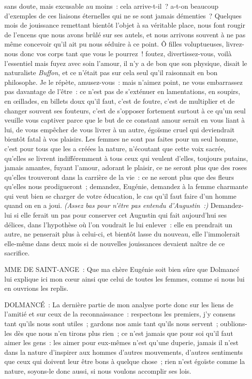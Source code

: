 \documentclass[french,twoside]{book} %
\begin{document}
sans doute, mais excusable au moins : cela arrive-t-il ? a-t-on beaucoup d’exemples de ces liaisons éternelles qui ne se sont jamais démenties ? Quelques mois de jouissance remettant bientôt l’objet à sa véritable place, nous font rougir de l’encens que nous avons brûlé sur ses autels, et nous arrivons souvent à ne pas même concevoir qu’il ait pu nous séduire à ce point. Ô filles voluptueuses, livrez-nous donc vos corps tant que vous le pourrez ! foutez, divertissez-vous, voilà l’essentiel mais fuyez avec soin l’amour, il n’y a de bon que son physique, disait le naturaliste {\itshape Buffon}, et ce n’était pas sur cela seul qu’il raisonnait en bon philosophe. Je le répète, amusez-vous : mais n’aimez point, ne vous embarrassez pas davantage de l’être : ce n’est pas de s’exténuer en lamentations, en soupirs, en œillades, en billets doux qu’il faut, c’est de foutre, c’est de multiplier et de changer souvent ses fouteurs, c’est de s’opposer fortement surtout à ce qu’un seul veuille vous captiver parce que le but de ce constant amour serait en vous liant à lui, de vous empêcher de vous livrer à un autre, égoïsme cruel qui deviendrait bientôt fatal à vos plaisirs. Les femmes ne sont pas faites pour un seul homme, c’est pour tous que les a créées la nature, n’écoutant que cette voix sacrée, qu’elles se livrent indifféremment à tous ceux qui veulent d’elles, toujours putains, jamais amantes, fuyant l’amour, adorant le plaisir, ce ne seront plus que des roses qu’elles trouveront dans la carrière de la vie : ce ne seront plus que des fleurs qu’elles nous prodigueront ; demandez, Eugénie, demandez à la femme charmante qui veut bien se charger de votre éducation, le cas qu’il faut faire d’un homme quand on en a joui. {\itshape (Assez bas pour n’être pas entendu d’Augustin :)} Demandez-lui si elle ferait un pas pour conserver cet Augustin qui fait aujourd’hui ses délices, dans l’hypothèse où l’on voudrait le lui enlever : elle en prendrait un autre, ne penserait plus à celui-ci, et bientôt lasse du nouveau, elle l’immolerait elle-même dans deux mois si de nouvelles jouissances devaient naître de ce sacrifice.\par
MME DE SAINT-ANGE : Que ma chère Eugénie soit bien sûre que Dolmancé lui explique ici mon cœur ainsi que celui de toutes les femmes, comme si nous lui en ouvrions les replis.\par
DOLMANCÉ : La dernière partie de mon analyse porte donc sur les liens de l’amitié et sur ceux de la reconnaissance : respectons les premiers, j’y consens tant qu’ils nous sont utiles ; gardons nos amis tant qu’ils nous servent ; oublions-les dès que nous n’en tirons plus rien ; ce n’est jamais que pour soi qu’il faut aimer les gens : les aimer pour eux-mêmes n’est qu’une duperie, jamais il n’est dans la nature d’inspirer aux hommes d’autres mouvements, d’autres sentiments que ceux qui doivent leur être bons à quelque chose ; rien n’est égoïste comme la nature, soyons-le donc aussi, si nous voulons accomplir ses lois.\par
\end{document}
